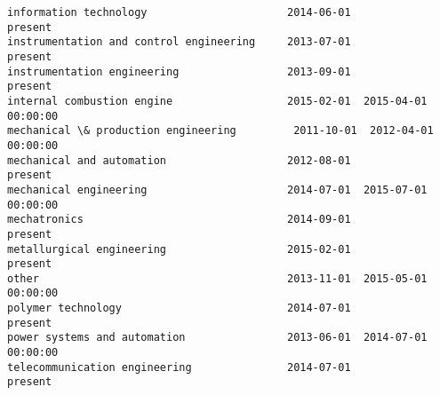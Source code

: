 \documentclass[11pt]{article}
\begin{document}
\begin{tcolorbox}[breakable, size=fbox, boxrule=.5pt, pad at break*=1mm, opacityfill=0]
\begin{Verbatim}[commandchars=\\\{\}]
information technology                      2014-06-01              present
instrumentation and control engineering     2013-07-01              present
instrumentation engineering                 2013-09-01              present
internal combustion engine                  2015-02-01  2015-04-01 00:00:00
mechanical \& production engineering         2011-10-01  2012-04-01 00:00:00
mechanical and automation                   2012-08-01              present
mechanical engineering                      2014-07-01  2015-07-01 00:00:00
mechatronics                                2014-09-01              present
metallurgical engineering                   2015-02-01              present
other                                       2013-11-01  2015-05-01 00:00:00
polymer technology                          2014-07-01              present
power systems and automation                2013-06-01  2014-07-01 00:00:00
telecommunication engineering               2014-07-01              present


\end{Verbatim}
\end{tcolorbox}
\end{document}
